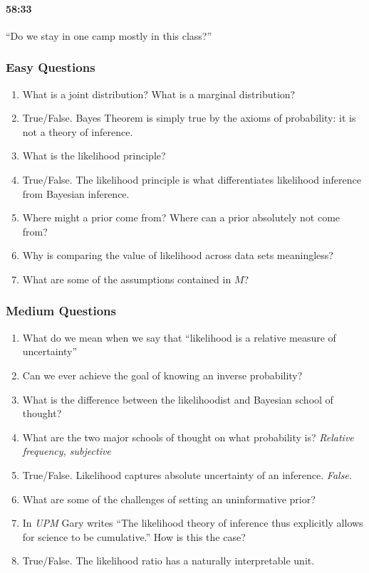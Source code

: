 \documentclass[11pt]{article}
\begin{document}
\paragraph{58:33} ``Do we stay in one camp mostly in this class?''


\subsubsection{Easy Questions}
\begin{enumerate}
\item What is a joint distribution?  What is a marginal distribution?
\item True/False. Bayes Theorem is simply true by the axioms of probability: it is not a theory of inference.
\item What is the likelihood principle?
\item True/False. The likelihood principle is what differentiates likelihood inference from Bayesian inference.
\item Where might a prior come from?  Where can a prior absolutely not come from?
\item Why is comparing the value of likelihood across data sets meaningless?
\item What are some of the assumptions contained in $M$?
\end{enumerate}

\subsubsection{Medium Questions}

\begin{enumerate}
\item What do we mean when we say that ``likelihood is a relative measure of uncertainty''
\item Can we ever achieve the goal of knowing an inverse probability?
\item What is the difference between the likelihoodist and Bayesian school of thought?
\item What are the two major schools of thought on what probability is? \textit{Relative frequency, subjective}
\item True/False. Likelihood captures absolute uncertainty of an inference. \textit{False.}
\item What are some of the challenges of setting an uninformative prior?
\item In \textit{UPM} Gary writes ``The likelihood theory of inference thus explicitly allows for science to be cumulative.''  How is this the case?
\item True/False. The likelihood ratio has a naturally interpretable unit.
\end{enumerate}
\end{document}
